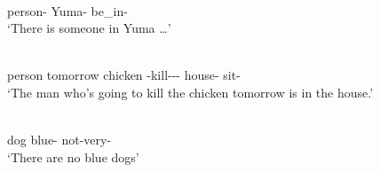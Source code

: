 \begin{exe}\ex\label{MojExLoc}
 \begin{xlist}
\ex \gll{}  \\
person-\nom{} Yuma-\loc{} be\_in-\tns{}\\
\glt `There is someone in Yuma \dots' 

\ex\gll{}     \\
person tomorrow chicken \relativ{}-kill-\irr{}-\dem{}-\nom{} house-\loc{} sit-\tns{}\\
\glt `The man who's going to kill the chicken tomorrow is in the house.'

\ex\gll{}  \\
dog blue-\nom{} not-very-\augv{}\\
\glt `There are no blue dogs'
\end{xlist}
\end{exe}

